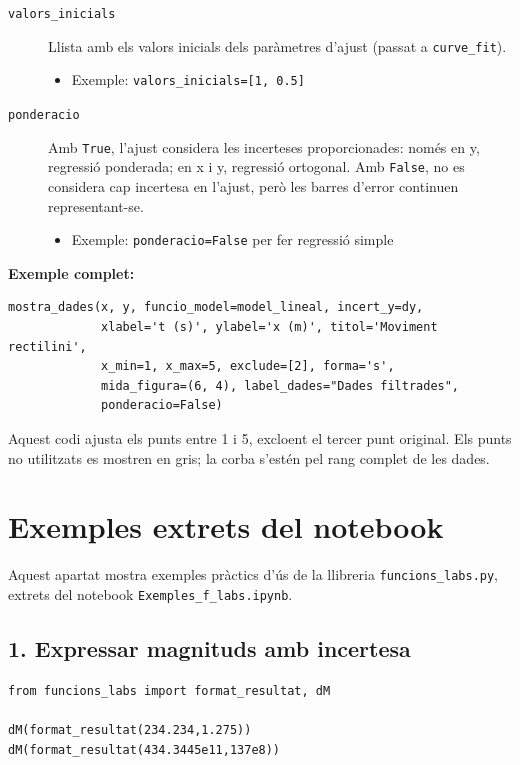 \documentclass[11pt,a4paper]{article}
\begin{document}
\begin{description}
  \item[\texttt{valors\_inicials}] Llista amb els valors inicials dels paràmetres d’ajust (passat a \texttt{curve\_fit}).
    \begin{itemize}
      \item Exemple: \texttt{valors\_inicials=[1, 0.5]} 
    \end{itemize}
    
  \item[\texttt{ponderacio}] Amb \texttt{True}, l'ajust considera les incerteses proporcionades: només en y, regressió ponderada; en x i y, regressió ortogonal. Amb \texttt{False}, no es considera cap incertesa en l'ajust, però les barres d'error continuen representant-se.
    \begin{itemize}
      \item Exemple: \texttt{ponderacio=False} per fer regressió simple
    \end{itemize}

\end{description}

\textbf{Exemple complet:}
\begin{lstlisting}
mostra_dades(x, y, funcio_model=model_lineal, incert_y=dy,
             xlabel='t (s)', ylabel='x (m)', titol='Moviment rectilini',
             x_min=1, x_max=5, exclude=[2], forma='s',
             mida_figura=(6, 4), label_dades="Dades filtrades",
             ponderacio=False)
\end{lstlisting}

Aquest codi ajusta els punts entre 1 i 5, excloent el tercer punt original. Els punts no utilitzats es mostren en gris; la corba s'estén pel rang complet de les dades.
\section{Exemples extrets del notebook}

Aquest apartat mostra exemples pràctics d'ús de la llibreria \texttt{funcions\_labs.py}, extrets del notebook \texttt{Exemples\_f\_labs.ipynb}.

\subsection*{1. Expressar magnituds amb incertesa}

\begin{lstlisting}
from funcions_labs import format_resultat, dM

dM(format_resultat(234.234,1.275))
dM(format_resultat(434.3445e11,137e8))
\end{lstlisting}
\end{document}
